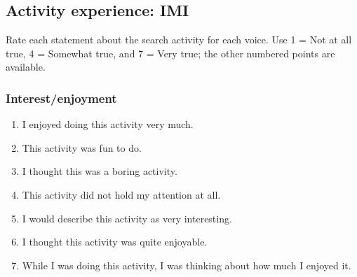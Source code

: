 \subsection{Activity experience: IMI}
Rate each statement about the search activity for each voice. Use 1 = Not at all true, 4 = Somewhat true, and 7 = Very true; the other numbered points are available.
\subsubsection*{Interest/enjoyment}\label{imi1}
\begin{enumerate}
\item \begin{minipage}[t]{\linewidth}
I enjoyed doing this activity very much.
\end{minipage}
\item \begin{minipage}[t]{\linewidth}
This activity was fun to do.
\end{minipage}
\item \begin{minipage}[t]{\linewidth}
I thought this was a boring activity.
\end{minipage}
\item \begin{minipage}[t]{\linewidth}
This activity did not hold my attention at all.
\end{minipage}
\item \begin{minipage}[t]{\linewidth}
I would describe this activity as very interesting.
\end{minipage}
\item \begin{minipage}[t]{\linewidth}
I thought this activity was quite enjoyable.
\end{minipage}
\item \begin{minipage}[t]{\linewidth}
While I was doing this activity, I was thinking about how much I enjoyed it.
\end{minipage}
\end{enumerate}
